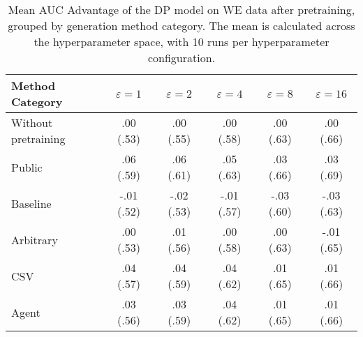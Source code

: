 \begin{table}[h!]
    \centering
    \caption{Mean AUC Advantage of the DP model on WE data after pretraining, grouped by generation method category. The mean is calculated across the hyperparameter space, with 10 runs per hyperparameter configuration.}
    \label{tab:epsilon_comparison}
    \begin{tabular}{lccccc}
    \toprule
    Method Category & $\varepsilon=1$ & $\varepsilon=2$ & $\varepsilon=4$ & $\varepsilon=8$ & $\varepsilon=16$ \\
    \midrule
    Without pretraining & .00 {\small (.53)} & .00 {\small (.55)} & .00 {\small (.58)} & .00 {\small (.63)} & .00 {\small (.66)} \\
    \arrayrulecolor{black!50!}\midrule
    Public & \cellcolor{gold!30}.06 {\small (.59)} & \cellcolor{gold!30}.06 {\small (.61)} & \cellcolor{gold!30}.05 {\small (.63)} & \cellcolor{gold!30}.03 {\small (.66)} & \cellcolor{gold!30}.03 {\small (.69)} \\
    \arrayrulecolor{black!50!}\midrule
    Baseline & -.01 {\small (.52)} & -.02 {\small (.53)} & -.01 {\small (.57)} & -.03 {\small (.60)} & -.03 {\small (.63)} \\
    \arrayrulecolor{black!50!}\midrule
    Arbitrary & .00 {\small (.53)} & .01 {\small (.56)} & .00 {\small (.58)} & .00 {\small (.63)} & \cellcolor{bronze!30}-.01 {\small (.65)} \\
    \arrayrulecolor{black!50!}\midrule
    CSV & \cellcolor{silver!30}.04 {\small (.57)} & \cellcolor{silver!30}.04 {\small (.59)} & \cellcolor{silver!30}.04 {\small (.62)} & \cellcolor{bronze!30}.01 {\small (.65)} & \cellcolor{silver!30}.01 {\small (.66)} \\
    Agent & \cellcolor{bronze!30}.03 {\small (.56)} & \cellcolor{bronze!30}.03 {\small (.59)} & \cellcolor{bronze!30}.04 {\small (.62)} & \cellcolor{silver!30}.01 {\small (.65)} & \cellcolor{silver!30}.01 {\small (.66)} \\
    \bottomrule
    \end{tabular}
\end{table}